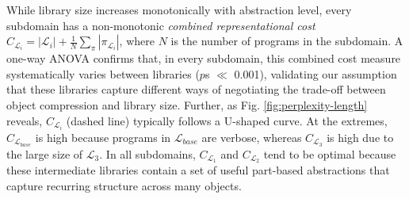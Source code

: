 While library size increases monotonically with abstraction level, every subdomain has a non-monotonic \textit{combined representational cost} $C_{\mathcal{L}_i} = |\mathcal{L}_i| + \frac{1}{N} \sum_{\pi} |\pi_{\mathcal{L}_i}|$, where $N$ is the number of programs in the subdomain. 
A one-way ANOVA confirms that, in every subdomain, this combined cost measure systematically varies between libraries ($p$s $\ll$ 0.001), validating our assumption that these libraries capture different ways of negotiating the trade-off between object compression and library size. 
Further, as Fig. \ref{fig:perplexity-length} reveals, $C_{\mathcal{L}_i}$ (dashed line) typically follows a U-shaped curve. 
At the extremes, $C_{\mathcal{L}_{base}}$ is high because programs in $\mathcal{L}_{base}$ are verbose, whereas $C_{\mathcal{L}_3}$ is high due to the large size of ${\mathcal{L}_3}$. In all subdomains, $C_{\mathcal{L}_1}$ and $C_{\mathcal{L}_2}$ tend to be optimal because these intermediate libraries contain a set of useful part-based abstractions that capture recurring structure across many objects. 



